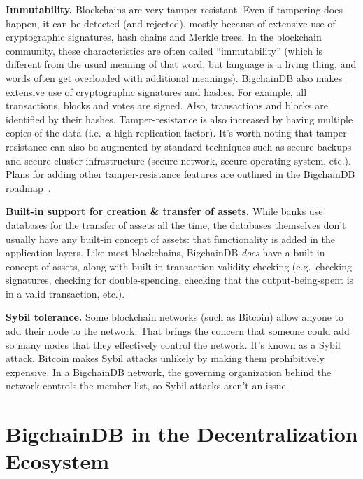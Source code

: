 \documentclass[a4paper]{article}
\begin{document}
\noindent \textbf{Immutability.}
Blockchains are very tamper-resistant.
Even if tampering does happen, it can be detected
(and rejected),
mostly because of extensive use of cryptographic signatures,
hash chains and Merkle trees.
In the blockchain community,
these characteristics are often called ``immutability''
(which is different from the usual meaning of that word,
but language is a living thing,
and words often get overloaded with additional meanings).
BigchainDB also makes extensive use
of cryptographic signatures and hashes.
For example, all transactions,
blocks and votes are signed.
Also, transactions and blocks are identified
by their hashes.
Tamper-resistance is also increased
by having multiple copies of the data
(i.e.~a high replication factor).
It's worth noting that tamper-resistance can also be augmented
by standard techniques such as secure backups
and secure cluster infrastructure (secure network, secure operating system, etc.).
Plans for adding other tamper-resistance features
are outlined in the BigchainDB roadmap~\cite{bigchaindb_roadmap}.

\vspace{1 em}

\noindent \textbf{Built-in support for creation \& transfer of assets.}
While banks use databases for the transfer of assets all the time,
the databases themselves don't usually have any built-in concept of assets:
that functionality is added in the application layers.
Like most blockchains,
BigchainDB \emph{does} have a built-in concept of assets,
along with built-in
transaction validity checking
(e.g.~checking signatures,
checking for double-spending,
checking that the output-being-spent is in a valid transaction, etc.).

\vspace{1 em}

\noindent \textbf{Sybil tolerance.}
Some blockchain networks (such as Bitcoin) allow anyone
to add their node to the network.
That brings the concern that someone could add
so many nodes that they effectively control the network.
It's known as a Sybil attack.
Bitcoin makes Sybil attacks unlikely by making them
prohibitively expensive.
In a BigchainDB network,
the governing organization behind the network
controls the member list,
so Sybil attacks aren't an issue.


\section{BigchainDB in the Decentralization \mbox{Ecosystem}}
\end{document}
